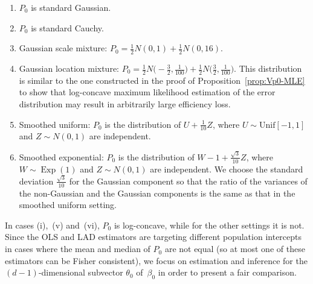 \documentclass[a4paper]{article}
\DeclareMathOperator\Exp{Exp}
\theoremstyle{definition}
\begin{document}
\begin{enumerate}[label=(\roman*)]
\item $P_0$ is standard Gaussian.
\item $P_0$ is standard Cauchy.
\item Gaussian scale mixture: $P_0 = \frac{1}{2} N(0, 1) + \frac{1}{2} N(0, 16)$.
\item Gaussian location mixture: $P_0 = \frac{1}{2} N\bigl(- \frac{3}{2}, \frac{1}{100} \bigr) + \frac{1}{2} N\bigl( \frac{3}{2}, \frac{1}{100} \bigr)$.  This distribution is similar to the one constructed in the proof of Proposition~\ref{prop:Vp0-MLE} to show that log-concave maximum likelihood estimation of the error distribution may result in arbitrarily large efficiency loss.
\item Smoothed uniform: $P_0$ is the distribution of $U + \frac{1}{10} Z$, where $U \sim \mathrm{Unif}[-1,1]$ and $Z \sim N(0,1)$ are independent.
\item Smoothed exponential: $P_0$ is the distribution of $W - 1 + \frac{\sqrt{3}}{10} Z$, where $W \sim \Exp(1)$ and $Z \sim N(0,1)$ are independent. We choose the standard deviation $\frac{\sqrt{3}}{10}$ for the Gaussian component so that the ratio of the variances of the non-Gaussian and the Gaussian components is the same as that in the smoothed uniform setting.
\end{enumerate}
In cases (i),~(v) and~(vi), $P_0$ is log-concave, while for the other settings it is not.  Since the OLS and LAD estimators are targeting different population intercepts in cases where the mean and median of $P_0$ are not equal (so at most one of these estimators can be Fisher consistent), we focus on estimation and inference for the $(d-1)$-dimensional subvector $\theta_0$ of~$\beta_0$ in order to present a fair comparison.  

\end{document}
